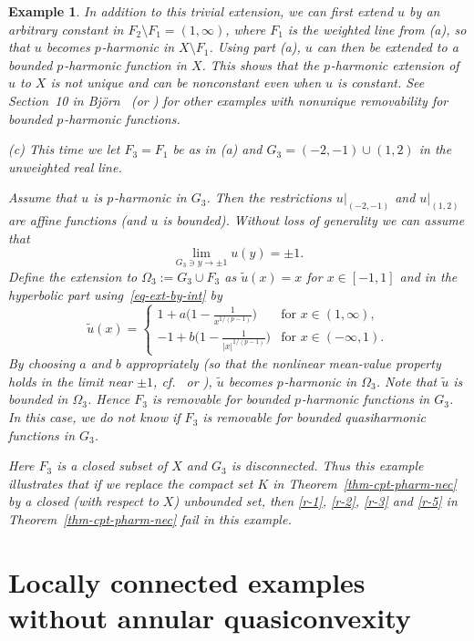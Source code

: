 \documentclass[a4paper,twoside]{article}
\theoremstyle{propositional}
\theoremstyle{descriptive}
\newtheorem{example}[thm]{Example}
\theoremstyle{remarkstyle}
\newcommand{\setm}{\setminus}
\newcommand{\Om}{\Omega}
\newcommand{\p}{{$p\mspace{1mu}$}}
\newcommand{\ut}{\tilde{u}}
\numberwithin{equation}{section}
\begin{document}
\begin{example}
In addition to this trivial extension, we can first extend $u$ by 
an arbitrary constant in 
$F_2\setm F_1 = (1,\infty)$, where $F_1$ is the weighted
line from  (a), so that $u$ becomes \p-harmonic in $X\setm F_1$.
Using part (a), $u$ can then be extended to a bounded \p-harmonic function in $X$.
This shows that the \p-harmonic extension of $u$ to $X$ is not unique and can be
nonconstant even when $u$ is constant.
See Section~10 in Bj\"orn~\cite{ABremove}
(or \cite[Section~12.4]{BBbook}) for other examples with 
nonunique removability for bounded \p-harmonic functions.


(c)
This time we let $F_3=F_1$ be as in (a) and $G_3=(-2,-1) \cup (1,2)$ 
in the unweighted real line.

Assume that $u$ is \p-harmonic in $G_3$. 
Then the restrictions
$u|_{(-2,-1)}$ and $u|_{(1,2)}$ are affine functions
(and $u$ is bounded).
Without loss of generality we can assume that
\[
     \lim_{G_3 \ni y \to \pm 1} u(y)=\pm 1.
\]
Define the extension to $\Om_3:=G_3 \cup F_3$
as $\ut(x)=x$ for $x\in [-1,1]$ and 
in the hyperbolic part using~\eqref{eq-ext-by-int} by 
\[
\ut(x)= \begin{cases}
 \displaystyle 
1+ a\biggl(1-\frac{1}{x^{1/(p-1)}}\biggr)
& \text{for } x\in (1,\infty), \\
   \displaystyle 
-1+ b\biggl(1-\frac{1}{|x|^{1/(p-1)}}\biggr)
 & \text{for }  x\in (-\infty,1).
\end{cases}
\]
By choosing $a$ and $b$ appropriately (so that the nonlinear
mean-value property holds
in the limit near $\pm 1$, cf.\ \cite[Theorem~A.26]{BBbook}
or \cite[(7.5)]{BBSliouville}), $\ut$ becomes \p-harmonic in $\Om_3$.
Note that $\ut$ is bounded in $\Om_3$.
Hence $F_3$ is removable for bounded \p-harmonic functions
in $G_3$. 
In this case, we do not know if 
$F_3$ is removable for bounded \emph{quasiharmonic} functions
in $G_3$.


Here $F_3$
is a closed subset of $X$ and
$G_3$ is disconnected.
Thus this example illustrates that if we replace the compact set $K$
in Theorem~\ref{thm-cpt-pharm-nec} by a closed (with respect to $X$) unbounded set,
then 
\ref{r-1}, \ref{r-2}, \ref{r-3} and \ref{r-5} in Theorem~\ref{thm-cpt-pharm-nec}
fail in this example.
\end{example}




\section{Locally connected examples
without annular quasiconvexity}
\label{sect-Janas-ex}
\end{document}
